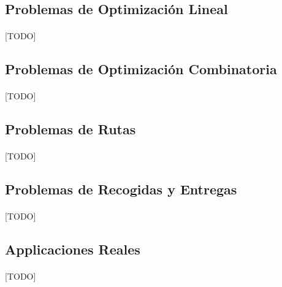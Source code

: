 \documentclass{subfiles}
\begin{document}
      \subsection{Problemas de Optimización Lineal}
      \label{sec:formulation_linear_problems}

        \paragraph{}
        [TODO]

      \subsection{Problemas de Optimización Combinatoria}
      \label{sec:formulation_combinatorial_problems}

        \paragraph{}
        [TODO]


      \subsection{Problemas de Rutas}
      \label{sec:formulation_routing_problems}

        \paragraph{}
        [TODO]


      \subsection{Problemas de Recogidas y Entregas}
      \label{sec:formulation_picup_and_delivery_problems}

        \paragraph{}
        [TODO]


      \subsection{Applicaciones Reales}
      \label{sec:formulation_applications}

        \paragraph{}
        [TODO]
\end{document}
